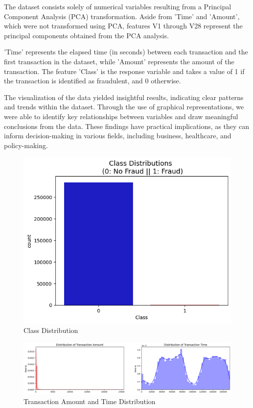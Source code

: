 The dataset consists solely of numerical variables resulting from a Principal Component Analysis (PCA) transformation. Aside from 'Time' and 'Amount', which were not transformed using PCA, features V1 through V28 represent the principal components obtained from the PCA analysis.

'Time' represents the elapsed time (in seconds) between each transaction and the first transaction in the dataset, while 'Amount' represents the amount of the transaction. The feature 'Class' is the response variable and takes a value of 1 if the transaction is identified as fraudulent, and 0 otherwise.

The visualization of the data yielded insightful results, indicating clear patterns and trends within the dataset. Through the use of graphical representations, we were able to identify key relationships between variables and draw meaningful conclusions from the data. These findings have practical implications, as they can inform decision-making in various fields, including business, healthcare, and policy-making.

\begin{figure}[h]
	\centering
	\includegraphics[width=0.7\linewidth]{../output7}
	\caption[Class Distribution]{Class Distribution}
	\label{Class Distribution}
\end{figure}

\begin{figure}[h]
	\centering
	\includegraphics[width=0.7\linewidth]{../output8}
	\caption[Transaction Amount and Time Distribution ]{Transaction Amount and Time Distribution}
	\label{Transaction Amount and Time Distribution}
\end{figure}

